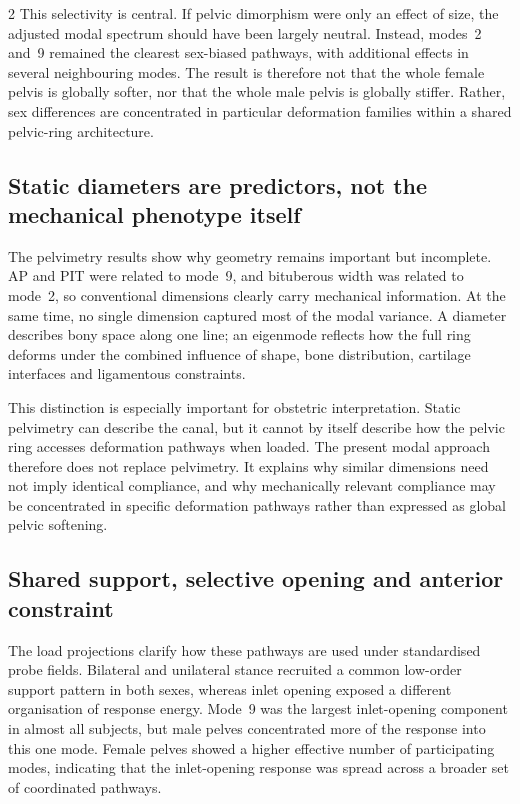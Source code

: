\documentclass[openacc]{rsproca_new}
\begin{document}
\begin{multicols}{2}
This selectivity is central. If pelvic dimorphism were only an effect of size, the adjusted modal spectrum should have been largely neutral. Instead, modes~2 and~9 remained the clearest sex-biased pathways, with additional effects in several neighbouring modes. The result is therefore not that the whole female pelvis is globally softer, nor that the whole male pelvis is globally stiffer. Rather, sex differences are concentrated in particular deformation families within a shared pelvic-ring architecture.

\subsection{Static diameters are predictors, not the mechanical phenotype itself}

The pelvimetry results show why geometry remains important but incomplete. AP and PIT were related to mode~9, and bituberous width was related to mode~2, so conventional dimensions clearly carry mechanical information. At the same time, no single dimension captured most of the modal variance. A diameter describes bony space along one line; an eigenmode reflects how the full ring deforms under the combined influence of shape, bone distribution, cartilage interfaces and ligamentous constraints.

This distinction is especially important for obstetric interpretation. Static pelvimetry can describe the canal, but it cannot by itself describe how the pelvic ring accesses deformation pathways when loaded. The present modal approach therefore does not replace pelvimetry. It explains why similar dimensions need not imply identical compliance, and why mechanically relevant compliance may be concentrated in specific deformation pathways rather than expressed as global pelvic softening.

\subsection{Shared support, selective opening and anterior constraint}

The load projections clarify how these pathways are used under standardised probe fields. Bilateral and unilateral stance recruited a common low-order support pattern in both sexes, whereas inlet opening exposed a different organisation of response energy. Mode~9 was the largest inlet-opening component in almost all subjects, but male pelves concentrated more of the response into this one mode. Female pelves showed a higher effective number of participating modes, indicating that the inlet-opening response was spread across a broader set of coordinated pathways.


\end{multicols}
\end{document}
